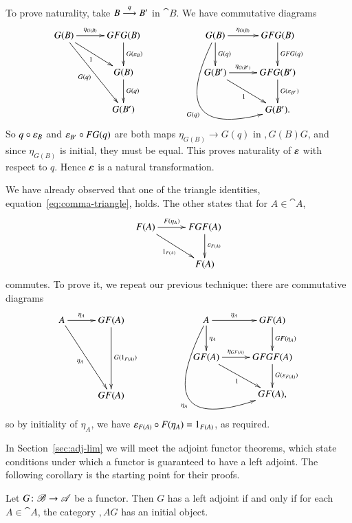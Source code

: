 \begin{pf}
To prove naturality, take $B \stackrel{q}{\longrightarrow} B'$ in $\cat{B}$.  We have commutative
diagrams
\[
\xymatrix@C+1ex{
G(B) \ar[r]^-{\eta_{G(B)}} \ar[rd]_1 \ar[rdd]_{G(q)}     &
GFG(B) \ar[d]^{G(\epsln_B)}     \\
        &G(B) \ar[d]^{G(q)}     \\
        &G(B')
}
%
\qquad\qquad
%
\xymatrix@C+1ex{
G(B) \ar[r]^-{\eta_{G(B)}} \ar[d]^{G(q)}
\ar@/^-5pc/[rdd]_{G(q)}  &
GFG(B) \ar[d]^{GFG(q)}  \\
G(B') \ar[r]^-{\eta_{G(B')}} \ar[rd]_1   &
GFG(B') \ar[d]^{G(\epsln_{B'})} \\
        &
G(B').
}
\]
So $q \mathbin{\circ} \varepsilon_B$ and $\varepsilon_{B'} \mathbin{\circ} FG(q)$ are both maps $\eta_{G(B)} \to
G(q)$ in $\comma{G(B)}{G}$, and since $\eta_{G(B)}$ is initial, they must be
equal.  This proves naturality of $\varepsilon$ with respect to $q$.  Hence
$\varepsilon$ is a natural transformation.

We have already observed that one of the triangle identities,
equation~\eqref{eq:comma-triangle}, holds.  The other states that for $A \in
\cat{A}$,
\[
\xymatrix@C+1ex{
F(A) \ar[r]^-{F(\eta_A)} \ar[rd]_{1_{F(A)}}      &
FGF(A) \ar[d]^{\epsln_{F(A)}}   \\
        &
F(A)
}
\]
commutes.  To prove it, we repeat our previous technique: there are
commutative diagrams
\[
\xymatrix@R+.5em@C+1ex{
A \ar[r]^-{\eta_A} \ar[rdd]_{\eta_A}     &
GF(A) \ar[dd]^{G(1_{F(A)})}     \\
        &       \\
        &GF(A)
}
%
\qquad\qquad
%
\xymatrix@C+1ex{
A \ar[r]^-{\eta_A} \ar[d]^{\eta_A}
\ar@/^-5.7pc/[rdd]_{\eta_A}  &
GF(A) \ar[d]^{GF(\eta_A)}       \\
GF(A) \ar[r]^-{\eta_{GF(A)}} \ar[rd]_1   &
GFGF(A) \ar[d]^{G(\epsln_{F(A)})}       \\
        &
GF(A),
}
\]
so by initiality of $\eta_A$, we have $\varepsilon_{F(A)} \mathbin{\circ} F(\eta_A) =
1_{F(A)}$, as required.
\end{pf}

In Section~\ref{sec:adj-lim} we will meet the adjoint functor theorems,
which state conditions under which a functor is guaranteed to have a left
adjoint.  The following corollary is the starting point for their proofs.

\begin{cor}
\label{cor:pre-AFT}
Let $G\from \cat{B} \to \cat{A}$ be a functor.  Then $G$ has a left adjoint if
and only if for each $A \in \cat{A}$, the category $\comma{A}{G}$ has an
initial object.
\end{cor}

